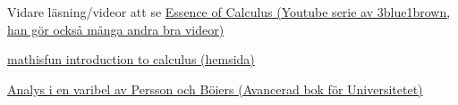 \documentclass{beamer}
\begin{document}
\begin{frame}{Vidare läsning/videor att se}
\href{https://www.youtube.com/watch?v=WUvTyaaNkzM\&list=PLZHQObOWTQDMsr9K-rj53DwVRMYO3t5Yr}{Essence of Calculus (Youtube serie av 3blue1brown, han gör också många andra bra videor)}

\href{https://www.mathsisfun.com/calculus/introduction.html}{mathisfun introduction to calculus (hemsida)}

\href{https://www.adlibris.com/se/bok/analys-i-en-variabel-9789144067650?msclkid=fdec5fb7484513345f2c3e741ec46196\&utm\_source=bing\&utm\_medium=cpc\&utm\_campaign=BOK\%20-\%20Search\%20-\%20Generic\%20-\%20Student\%20Titlar\&utm\_term=Analys\%20i\%20en\%20variabel\&utm\_content=Student\%20Titlar}{Analys i en varibel av Persson och Böiers (Avancerad bok för Universitetet)}
\end{frame}
\end{document}
